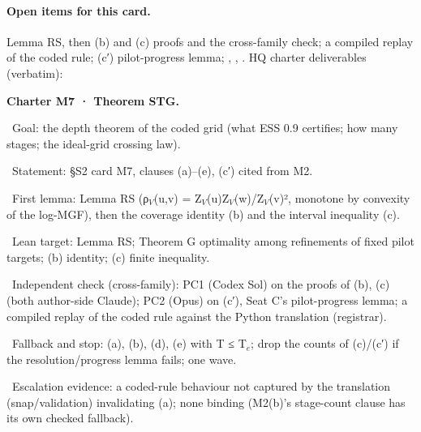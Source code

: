 \paragraph{Open items for this card.} Lemma RS, then (b) and (c) proofs and the cross-family check; a compiled replay of the coded rule; (c′) pilot-progress lemma; , , . HQ charter deliverables (verbatim):
\par\noindent \textbf{Charter M7 · Theorem STG.}
\par\noindent \textbullet~Goal: the depth theorem of the coded grid (what ESS 0.9 certifies; how many stages; the ideal-grid crossing law).
\par\noindent \textbullet~Statement: §S2 card M7, clauses (a)–(e), (c′) cited from M2.
\par\noindent \textbullet~First lemma: Lemma RS (ρ$_{V}$(u,v) = Z$_{V}$(u)Z$_{V}$(w)/Z$_{V}$(v)², monotone by convexity of the log-MGF), then the coverage identity (b) and the interval inequality (c).
\par\noindent \textbullet~Lean target: Lemma RS; Theorem G optimality among refinements of fixed pilot targets; (b) identity; (c) finite inequality.
\par\noindent \textbullet~Independent check (cross-family): PC1 (Codex Sol) on the proofs of (b), (c) (both author-side Claude); PC2 (Opus) on (c′), Seat C's pilot-progress lemma; a compiled replay of the coded rule against the Python translation (registrar).
\par\noindent \textbullet~Fallback and stop: (a), (b), (d), (e) with T ≤ T$_{e}$; drop the counts of (c)/(c′) if the resolution/progress lemma fails; one wave.
\par\noindent \textbullet~Escalation evidence: a coded-rule behaviour not captured by the translation (snap/validation) invalidating (a); none binding (M2(b)'s stage-count clause has its own checked fallback).

